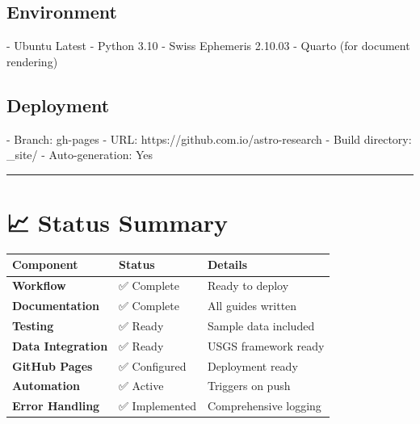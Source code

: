 \documentclass[
  11pt,
  oneside,
  openany]{scrbook}
\newenvironment{Shaded}{\begin{snugshade}}{\end{snugshade}}
\newcommand{\AttributeTok}[1]{\textcolor[rgb]{0.40,0.45,0.13}{#1}}
\newcommand{\CharTok}[1]{\textcolor[rgb]{0.13,0.47,0.30}{#1}}
\newcommand{\FunctionTok}[1]{\textcolor[rgb]{0.28,0.35,0.67}{#1}}
\newcommand{\KeywordTok}[1]{\textcolor[rgb]{0.00,0.23,0.31}{#1}}
\begin{document}
\section{\texorpdfstring{\textbf{Environment}}{Environment}}\label{environment}

\begin{Shaded}
\begin{Highlighting}[]
\KeywordTok{{-}}\AttributeTok{ Ubuntu Latest}
\KeywordTok{{-}}\AttributeTok{ Python 3.10}
\KeywordTok{{-}}\AttributeTok{ Swiss Ephemeris 2.10.03}
\KeywordTok{{-}}\AttributeTok{ Quarto (for document rendering)}
\end{Highlighting}
\end{Shaded}

\section{\texorpdfstring{\textbf{Deployment}}{Deployment}}\label{deployment}

\begin{Shaded}
\begin{Highlighting}[]
\KeywordTok{{-}}\AttributeTok{ }\FunctionTok{Branch}\KeywordTok{:}\AttributeTok{ gh{-}pages}
\KeywordTok{{-}}\AttributeTok{ }\FunctionTok{URL}\KeywordTok{:}\AttributeTok{ https://github.com.io/astro{-}research}
\KeywordTok{{-}}\AttributeTok{ }\FunctionTok{Build directory}\KeywordTok{:}\AttributeTok{ \_site/}
\KeywordTok{{-}}\AttributeTok{ }\FunctionTok{Auto{-}generation}\KeywordTok{:}\AttributeTok{ }\CharTok{Yes}
\end{Highlighting}
\end{Shaded}

\begin{center}\rule{0.5\linewidth}{0.5pt}\end{center}

\chapter{📈 Status Summary}\label{status-summary}

\begin{longtable}[]{@{}lll@{}}
\toprule\noalign{}
Component & Status & Details \\
\midrule\noalign{}
\endhead
\bottomrule\noalign{}
\endlastfoot
\textbf{Workflow} & ✅ Complete & Ready to deploy \\
\textbf{Documentation} & ✅ Complete & All guides written \\
\textbf{Testing} & ✅ Ready & Sample data included \\
\textbf{Data Integration} & ✅ Ready & USGS framework ready \\
\textbf{GitHub Pages} & ✅ Configured & Deployment ready \\
\textbf{Automation} & ✅ Active & Triggers on push \\
\textbf{Error Handling} & ✅ Implemented & Comprehensive logging \\
\end{longtable}
\end{document}
